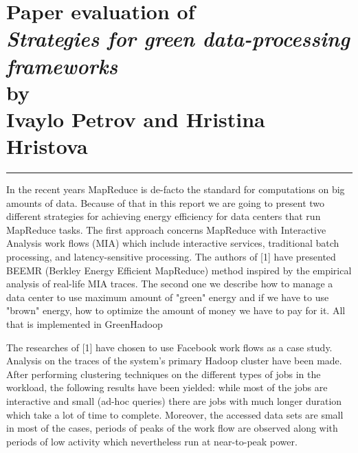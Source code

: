 \documentclass[9pt, a4paper]{article}
\newcommand{\hr}{\rule{\linewidth}{0.1mm}}
\theoremstyle{plain}
\begin{document}


\section*{\centering
  Paper evaluation of\\
  \emph{Strategies for green data-processing frameworks}\\
  by\\
  Ivaylo Petrov and Hristina Hristova
}

\hr

In the recent years MapReduce is de-facto the standard for computations on
big amounts of data. Because of that in this report we are going to present two
different strategies for achieving energy efficiency for data centers that run
MapReduce tasks. The first approach concerns MapReduce with Interactive Analysis
work flows (MIA) which include interactive services, traditional batch
processing, and latency-sensitive processing. The authors of [1] have presented
BEEMR (Berkley Energy Efficient MapReduce) method inspired by the empirical
analysis of real-life MIA traces. The second one we describe how to manage a
data center to use maximum amount of "green" energy and if we have to use
"brown" energy, how to optimize the amount of money we have to pay for it. All
that is implemented in GreenHadoop \cite{greenhadoop}

The researches of [1] have chosen to use Facebook work flows as a case study. Analysis
on the traces of the system's primary Hadoop cluster have been made. After performing
clustering techniques on the different types of jobs in the workload, the following
results have been yielded: while most of the jobs are interactive and small (ad-hoc
queries) there are jobs with much longer duration which take a lot of time to complete.
Moreover, the accessed data sets are small in most of the cases, periods of peaks of the work flow
are observed along with periods of low activity which nevertheless run at near-to-peak
power.
\end{document}
